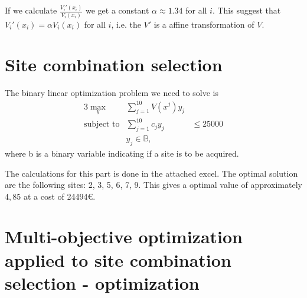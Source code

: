 \documentclass{article}
\begin{document}
	If we calculate $\frac{V_i'(x_i)}{V_i(x_i)}$ we get a constant $\alpha\approx1.34$ for all $i$. This suggest that $V_i'(x_i)=\alpha V_i(x_i)$ for all $i$, i.e. the $V'$ is a affine transformation of $V$. 
	
\section{Site combination selection}
	The binary linear optimization problem we need to solve is
	\begin{alignat}{3}
		\max_y& \sum_{j=1}^{10} V(x^j)y_j\\
		\text{subject to} & \sum_{j=1}^{10} c_jy_j &\leq 25000\\
		&y_j \in \mathbb{B},
	\end{alignat}
	where b is a binary variable indicating if a site is to be acquired. 
	
	The calculations for this part is done in the attached excel. The optimal solution are the following sites: 2, 3, 5, 6, 7, 9. This gives a optimal value of approximately $4,85$ at a cost of 24494\euro.

\section{Multi-objective optimization applied to site combination selection - optimization}

	
\end{document}
